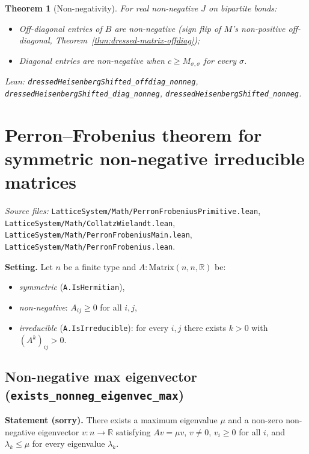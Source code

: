 \documentclass[a4paper,11pt]{article}
\newtheorem{theorem}{Theorem}
\begin{document}
\begin{theorem}[Non-negativity]
\label{thm:shifted-nonneg}
For real non-negative $J$ on bipartite bonds:
\begin{itemize}
\item Off-diagonal entries of $B$ are non-negative (sign flip of
$M$'s non-positive off-diagonal,
Theorem~\ref{thm:dressed-matrix-offdiag});
\item Diagonal entries are non-negative when $c \ge M_{\sigma, \sigma}$
for every $\sigma$.
\end{itemize}
Lean: \texttt{dressedHeisenbergShifted\_offdiag\_nonneg},
\texttt{dressedHeisenbergShifted\_diag\_nonneg},
\texttt{dressedHeisenbergShifted\_nonneg}.
\end{theorem}

\section{Perron--Frobenius theorem for symmetric non-negative irreducible matrices}
\label{sec:perron-frobenius}

\emph{Source files:}
\texttt{LatticeSystem/Math/PerronFrobeniusPrimitive.lean},
\texttt{LatticeSystem/Math/CollatzWielandt.lean},
\texttt{LatticeSystem/Math/PerronFrobeniusMain.lean},
\texttt{LatticeSystem/Math/PerronFrobenius.lean}.

\medskip
\textbf{Setting.}
Let $n$ be a finite type and $A : \mathrm{Matrix}(n,n,\mathbb{R})$ be:
\begin{itemize}
  \item \emph{symmetric} (\texttt{A.IsHermitian}),
  \item \emph{non-negative}: $A_{ij} \geq 0$ for all $i,j$,
  \item \emph{irreducible} (\texttt{A.IsIrreducible}): for every $i,j$
    there exists $k>0$ with $(A^k)_{ij} > 0$.
\end{itemize}

\subsection{Non-negative max eigenvector (\texttt{exists\_nonneg\_eigenvec\_max})}

\textbf{Statement (sorry).}
There exists a maximum eigenvalue $\mu$ and a non-zero non-negative eigenvector
$v : n \to \mathbb{R}$ satisfying $Av = \mu v$, $v \neq 0$,
$v_i \geq 0$ for all $i$, and $\lambda_k \leq \mu$ for every eigenvalue $\lambda_k$.
\end{document}

